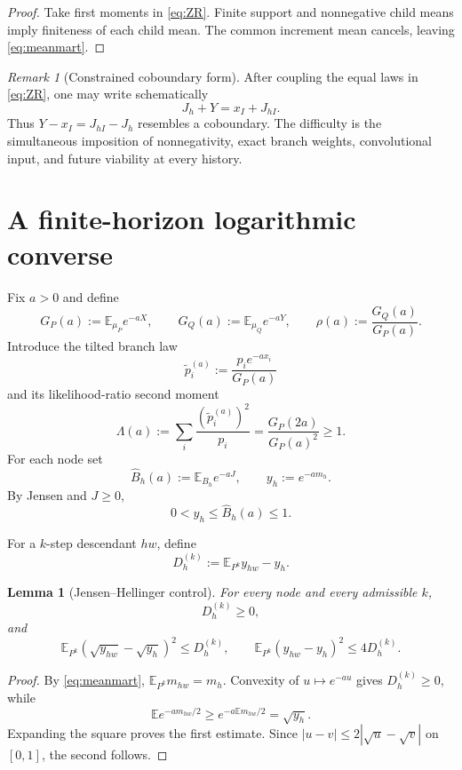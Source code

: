\documentclass[11pt,a4paper]{article}
\newtheorem{lemma}[theorem]{Lemma}
\theoremstyle{definition}
\theoremstyle{remark}
\newtheorem{remark}[theorem]{Remark}
\newcommand{\E}{\mathbb E}
\begin{document}
\begin{proof}
Take first moments in \eqref{eq:ZR}.  Finite support and nonnegative child
means imply finiteness of each child mean.  The common increment mean cancels,
leaving \eqref{eq:meanmart}.
\end{proof}

\begin{remark}[Constrained coboundary form]
After coupling the equal laws in \eqref{eq:ZR}, one may write schematically
\[
 J_h+Y=x_I+J_{hI}.
\]
Thus \(Y-x_I=J_{hI}-J_h\) resembles a coboundary.  The difficulty is the
simultaneous imposition of nonnegativity, exact branch weights, convolutional
input, and future viability at every history.
\end{remark}

\section{A finite-horizon logarithmic converse}
\label{sec:lower}

Fix \(a>0\) and define
\[
 G_P(a):=\E_{\mu_P}e^{-aX},
 \qquad
 G_Q(a):=\E_{\mu_Q}e^{-aY},
 \qquad
 \rho(a):=\frac{G_Q(a)}{G_P(a)}.
\]
Introduce the tilted branch law
\[
 \widetilde p_i^{(a)}:=\frac{p_ie^{-ax_i}}{G_P(a)}
\]
and its likelihood-ratio second moment
\begin{equation}
 \boxed{
 \Lambda(a):=
 \sum_i\frac{(\widetilde p_i^{(a)})^2}{p_i}
 =\frac{G_P(2a)}{G_P(a)^2}\ge1.
 }
 \label{eq:Lambda}
\end{equation}
For each node set
\[
 \widehat B_h(a):=\E_{B_h}e^{-aJ},
 \qquad
 y_h:=e^{-am_h}.
\]
By Jensen and \(J\ge0\),
\begin{equation}
 0<y_h\le\widehat B_h(a)\le1.
 \label{eq:JensenBasic}
\end{equation}

For a \(k\)-step descendant \(hw\), define
\[
 D_h^{(k)}:=\E_{P^k}y_{hw}-y_h.
\]

\begin{lemma}[Jensen--Hellinger control]
For every node and every admissible \(k\),
\[
 D_h^{(k)}\ge0,
\]
and
\begin{equation}
 \E_{P^k}\left(\sqrt{y_{hw}}-\sqrt{y_h}\right)^2
 \le D_h^{(k)},
 \qquad
 \E_{P^k}(y_{hw}-y_h)^2\le4D_h^{(k)}.
 \label{eq:JH}
\end{equation}
\end{lemma}

\begin{proof}
By \eqref{eq:meanmart}, \(\E_{P^k}m_{hw}=m_h\).  Convexity of
\(u\mapsto e^{-au}\) gives \(D_h^{(k)}\ge0\), while
\[
 \E e^{-am_{hw}/2}\ge e^{-a\E m_{hw}/2}=\sqrt{y_h}.
\]
Expanding the square proves the first estimate.  Since
\(|u-v|\le2|\sqrt u-\sqrt v|\) on \([0,1]\), the second follows.
\end{proof}
\end{document}
